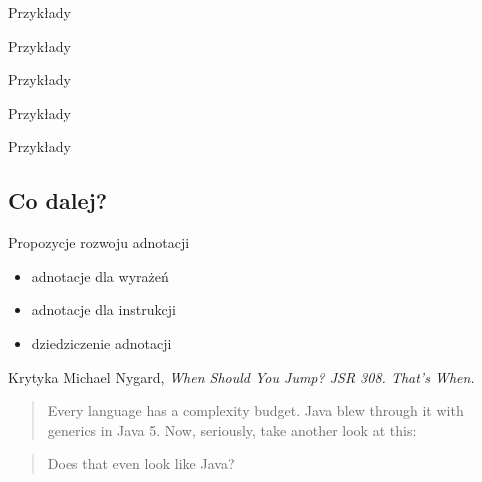 \documentclass{beamer}
\begin{document}
\begin{frame}{Przykłady}
  
  
\end{frame}

\begin{frame}{Przykłady}
  
  
\end{frame}

\begin{frame}{Przykłady}
  
  
\end{frame}

\begin{frame}{Przykłady}
  
\end{frame}

\begin{frame}{Przykłady}
  
  
\end{frame}

\subsection{Co dalej?}

\begin{frame}{Propozycje rozwoju adnotacji}
  \begin{itemize}
  \item<1-> adnotacje dla wyrażeń
  \item<2-> adnotacje dla instrukcji
  \item<3-> dziedziczenie adnotacji
  \end{itemize}
\end{frame}

\begin{frame}{Krytyka}
  Michael Nygard, \emph{When Should You Jump? JSR 308. That's When.}
  \pause
  \begin{quote}
Every language has a complexity budget. Java blew through it with
generics in Java 5. Now, seriously, take another look at this:
  \end{quote}
  
  \begin{quote}
    Does that even look like Java? 
  \end{quote}
\end{frame}
\end{document}
